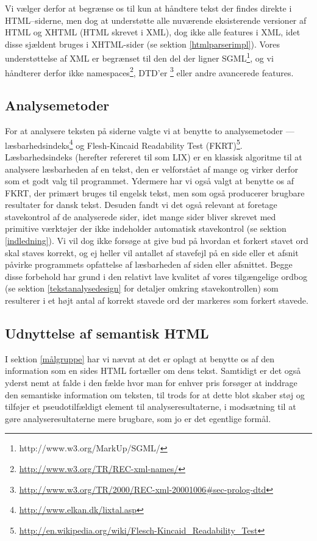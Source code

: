 \documentclass[a4paper,oneside]{memoir}
\begin{document}
Vi vælger derfor at begrænse os til kun at håndtere tekst der findes
direkte i HTML--siderne, men dog at understøtte alle nuværende
eksisterende versioner af HTML og XHTML (HTML skrevet i XML), dog ikke
alle features i XML, idet disse sjældent bruges i XHTML-sider (se
sektion \ref{htmlparserimpl}). Vores understøttelse af XML er
begrænset til den del der ligner
SGML\footnote{http://www.w3.org/MarkUp/SGML/}, og vi håndterer derfor
ikke namespaces\footnote{\url{http://www.w3.org/TR/REC-xml-names/}},
DTD'er
\footnote{\url{http://www.w3.org/TR/2000/REC-xml-20001006\#sec-prolog-dtd}}
eller andre avancerede features.

\subsection{Analysemetoder}
\label{analysemetoder}
For at analysere teksten på siderne valgte vi at benytte to
analysemetoder ---
læsbarhedsindeks\footnote{\url{http://www.elkan.dk/lixtal.asp}} og
Flesh-Kincaid Readability Test
(FKRT)\footnote{\url{http://en.wikipedia.org/wiki/Flesch-Kincaid_Readability_Test}}.
Læsbarhedsindeks (herefter refereret til som LIX) er en klassisk
algoritme til at analysere læsbarheden af en tekst, den er velforstået
af mange og virker derfor som et godt valg til programmet. Ydermere
har vi også valgt at benytte os af FKRT, der primært bruges til
engelsk tekst, men som også producerer brugbare resultater for dansk
tekst. Desuden fandt vi det også relevant at foretage stavekontrol af
de analyserede sider, idet mange sider bliver skrevet med primitive
værktøjer der ikke indeholder automatisk stavekontrol (se sektion
\ref{indledning}). Vi vil dog ikke forsøge at give bud på hvordan et
forkert stavet ord skal staves korrekt, og ej heller vil antallet af
stavefejl på en side eller et afsnit påvirke programmets opfattelse af
læsbarheden af siden eller afsnittet. Begge disse forbehold har grund
i den relativt lave kvalitet af vores tilgængelige ordbog (se sektion
\ref{tekstanalysedesign} for detaljer omkring stavekontrollen) som
resulterer i et højt antal af korrekt stavede ord der markeres som
forkert stavede.

\subsection{Udnyttelse af semantisk HTML}
\label{semantiskhtml}
I sektion \ref{målgruppe} har vi nævnt at det er oplagt at benytte os
af den information som en sides HTML fortæller om dens
tekst. Samtidigt er det også yderst nemt at falde i den fælde hvor man
for enhver pris forsøger at inddrage den semantiske information om
teksten, til trods for at dette blot skaber støj og tilføjer et
pseudotilfældigt element til analyseresultaterne, i modsætning til at
gøre analyseresultaterne mere brugbare, som jo er det egentlige
formål.
\end{document}

